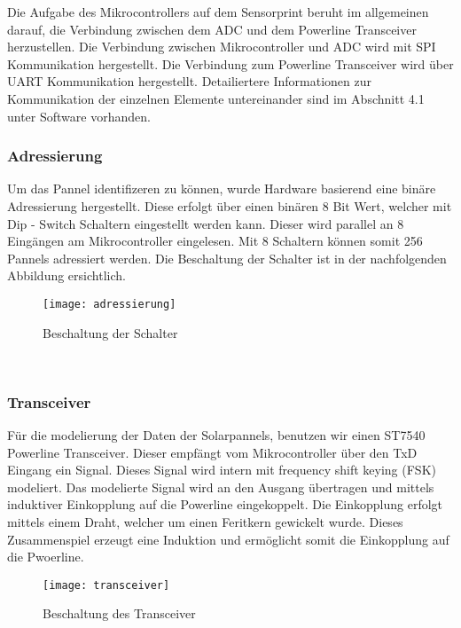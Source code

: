 Die Aufgabe des Mikrocontrollers auf dem Sensorprint beruht im allgemeinen darauf, die Verbindung zwischen dem ADC und dem Powerline Transceiver herzustellen. Die Verbindung zwischen Mikrocontroller und ADC wird mit SPI Kommunikation hergestellt. Die Verbindung zum Powerline Transceiver wird über UART Kommunikation hergestellt. Detailiertere Informationen zur Kommunikation der einzelnen Elemente untereinander sind im Abschnitt 4.1 unter Software vorhanden.


\clearpage

\subsubsection{Adressierung}
Um das Pannel identifizeren zu können, wurde Hardware basierend eine binäre Adressierung hergestellt. Diese erfolgt über einen binären 8 Bit Wert, welcher mit Dip - Switch Schaltern eingestellt werden kann. Dieser wird parallel an 8 Eingängen am Mikrocontroller eingelesen. Mit 8 Schaltern können somit 256 Pannels adressiert werden. Die Beschaltung der Schalter ist in der nachfolgenden Abbildung ersichtlich.

\begin{figure}[h]
\centering
\texttt{[image: adressierung]}
\caption{Beschaltung der Schalter}
\end{figure}

\
\

\subsubsection{Transceiver}
Für die modelierung der Daten der Solarpannels, benutzen wir einen ST7540 Powerline Transceiver. Dieser empfängt vom Mikrocontroller über den TxD Eingang ein Signal. Dieses Signal wird intern mit frequency shift keying (FSK) modeliert. Das modelierte Signal wird an den Ausgang übertragen und mittels induktiver Einkopplung auf die Powerline eingekoppelt. Die Einkopplung erfolgt mittels einem Draht, welcher um einen Feritkern gewickelt wurde. Dieses Zusammenspiel erzeugt eine Induktion und ermöglicht somit die Einkopplung auf die Pwoerline.

\clearpage

\begin{figure}[h]
\centering
\texttt{[image: transceiver]}
\caption{Beschaltung des Transceiver}
\end{figure}




